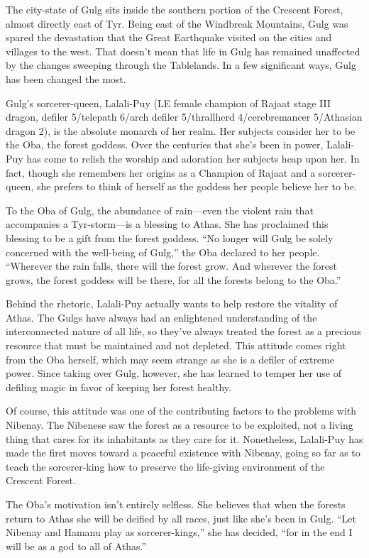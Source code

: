 {
	The city-state of Gulg sits inside the southern portion of the Crescent Forest, almost directly east of Tyr. Being east of the Windbreak Mountains, Gulg was spared the devastation that the Great Earthquake visited on the cities and villages to the west. That doesn't mean that life in Gulg has remained unaffected by the changes sweeping through the Tablelands. In a few significant ways, Gulg has been changed the most.

	Gulg's sorcerer-queen, Lalali-Puy (LE female champion of Rajaat stage III dragon, defiler 5/telepath 6/arch defiler 5/thrallherd 4/cerebremancer 5/Athasian dragon 2), is the absolute monarch of her realm. Her subjects consider her to be the Oba, the forest goddess. Over the centuries that she's been in power, Lalali-Puy has come to relish the worship and adoration her subjects heap upon her. In fact, though she remembers her origins as a Champion of Rajaat and a sorcerer-queen, she prefers to think of herself as the goddess her people believe her to be.

	To the Oba of Gulg, the abundance of rain---even the violent rain that accompanies a Tyr-storm---is a blessing to Athas. She has proclaimed this blessing to be a gift from the forest goddess. ``No longer will Gulg be solely concerned with the well-being of Gulg,'' the Oba declared to her people. ``Wherever the rain falls, there will the forest grow. And wherever the forest grows, the forest goddess will be there, for all the forests belong to the Oba.''

	Behind the rhetoric, Lalali-Puy actually wants to help restore the vitality of Athas. The Gulgs have always had an enlightened understanding of the interconnected nature of all life, so they've always treated the forest as a precious resource that must be maintained and not depleted. This attitude comes right from the Oba herself, which may seem strange as she is a defiler of extreme power. Since taking over Gulg, however, she has learned to temper her use of defiling magic in favor of keeping her forest healthy.

	Of course, this attitude was one of the contributing factors to the problems with Nibenay. The Nibenese saw the forest as a resource to be exploited, not a living thing that cares for its inhabitants as they care for it. Nonetheless, Lalali-Puy has made the first moves toward a peaceful existence with Nibenay, going so far as to teach the sorcerer-king how to preserve the life-giving environment of the Crescent Forest.

	The Oba's motivation isn't entirely selfless. She believes that when the forests return to Athas she will be deified by all races, just like she's been in Gulg. ``Let Nibenay and Hamanu play as sorcerer-kings,'' she has decided, ``for in the end I will be as a god to all of Athas.''
}
